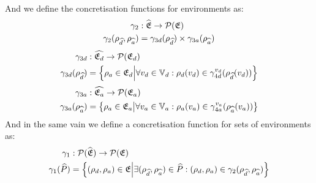 And we define the concretisation functions for environments as:
\begin{align}
    \gamma_2 &: \widehat{\mathfrak{E}} \rightarrow \mathcal{P}(\mathfrak{E}) \\
    \gamma_2(\rho_{\widehat{d}}, \rho_{\widehat{a}}) &= \gamma_{3d}(\rho_{\widehat{d}}) \times \gamma_{3a}(\rho_{\widehat{a}})
\end{align}
\begin{align}
    \gamma_{3d} &: \widehat{\mathfrak{E}_d} \rightarrow \mathcal{P}(\mathfrak{E}_d) \\
    \gamma_{3d}(\rho_{\widehat{d}}) &= \left\{ \rho_{a} \in \mathfrak{E}_d \middle| \forall v_d \in \mathbb{V}_d : \rho_d(v_d) \in \gamma^{v_d}_{4d}(\rho_{\widehat{d}}(v_d)) \right\}
\end{align}
\begin{align}
    \gamma_{3a} &: \widehat{\mathfrak{E}_a} \rightarrow \mathcal{P}(\mathfrak{E}_a) \\
    \gamma_{3a}(\rho_{\widehat{a}}) &= \left\{ \rho_{a} \in \mathfrak{E}_a \middle| \forall v_a \in \mathbb{V}_a : \rho_a(v_a) \in \gamma^{v_a}_{4a}(\rho_{\widehat{a}}(v_a)) \right\}
\end{align}
And in the same vain we define a concretisation function for sets of environments as:
\begin{align}
    \gamma_1 &: \mathcal{P}(\widehat{\mathfrak{E}}) \rightarrow \mathcal{P}(\mathfrak{E}) \\
    \gamma_1(\widehat{P}) &= \left\{ (\rho_{d}, \rho_{a}) \in \mathfrak{E} \middle| \exists (\rho_{\widehat{d}}, \rho_{\widehat{a}}) \in \widehat{P} : (\rho_{d}, \rho_{a}) \in \gamma_2(\rho_{\widehat{d}}, \rho_{\widehat{a}})\right\}
\end{align}


